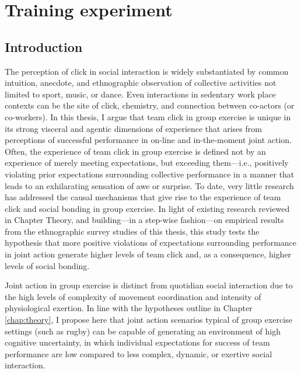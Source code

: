 

\begin{savequote}[8cm]

  \qauthor{}
\end{savequote}



\chapter{\label{chap:trainingExperiment}Training experiment}

\minitoc


\section{Introduction}
The perception of click in social interaction is widely substantiated by common intuition, anecdote, and ethnographic observation of collective activities not limited to sport, music, or dance.  Even interactions in sedentary work place contexts can be the site of click, chemistry, and connection between co-actors (or co-workers).  In this thesis, I argue that team click in group exercise is unique in its strong visceral and agentic dimensions of experience that arises from perceptions of successful performance in on-line and in-the-moment joint action.  Often, the experience of team click in group exercise is defined not by an experience of merely meeting expectations, but exceeding them---i.e., positively violating prior expectations surrounding collective performance in a manner that leads to an exhilarating sensation of awe or surprise.  To date, very little research has addressed the causal mechanisms that give rise to the experience of team click and social bonding in group exercise.  In light of existing research reviewed in Chapter Theory, and building---in a step-wise fashion---on empirical results from the ethnographic survey studies of this thesis, this study tests the hypothesis that more positive violations of expectations surrounding performance in joint action generate higher levels of team click and, as a consequence, higher levels of social bonding.

Joint action in group exercise is distinct from quotidian social interaction due to the high levels of complexity of movement coordination and intensity of physiological exertion.  In line with the hypotheses outline in Chapter \ref{chap:theory}, I propose here that joint action scenarios typical of group exercise settings (such as rugby) can be capable of generating an environment of high cognitive uncertainty, in which individual expectations for success of team performance are low compared to less complex, dynamic, or exertive social interaction.

